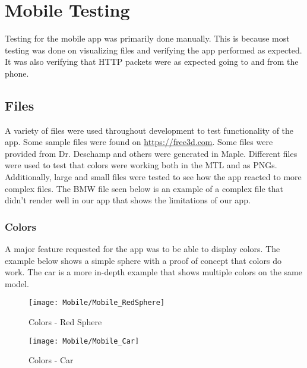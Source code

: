 
\section{Mobile Testing}
    Testing for the mobile app was primarily done manually. This is because most testing was done on visualizing files and verifying the app performed as expected.  It was also verifying that HTTP packets were as expected going to and from the phone.

    \subsection{Files}
        A variety of files were used throughout development to test functionality of the app. Some sample files were found on \url{https://free3d.com}. Some files were provided from Dr. Deschamp and others were generated in Maple. Different files were used to test that colors were working both in the MTL and as PNGs. Additionally, large and small files were tested to see how the app reacted to more complex files. The BMW file seen below is an example of a complex file that didn't render well in our app that shows the limitations of our app.
        
        \subsubsection{Colors}
        
            A major feature requested for the app was to be able to display colors. The example below shows a simple sphere with a proof of concept that colors do work. The car is a more in-depth example that shows multiple colors on the same model.
            
            \begin{figure}[H]
                \texttt{[image: Mobile/Mobile\_RedSphere]}
                \centering
                \caption{Colors - Red Sphere}
                \label{fig:mobileRedSphere}
            \end{figure}

            \begin{figure}[H]
                \texttt{[image: Mobile/Mobile\_Car]}
                \centering
                \caption{Colors - Car}
                \label{fig:mobileCar}
            \end{figure}
        
